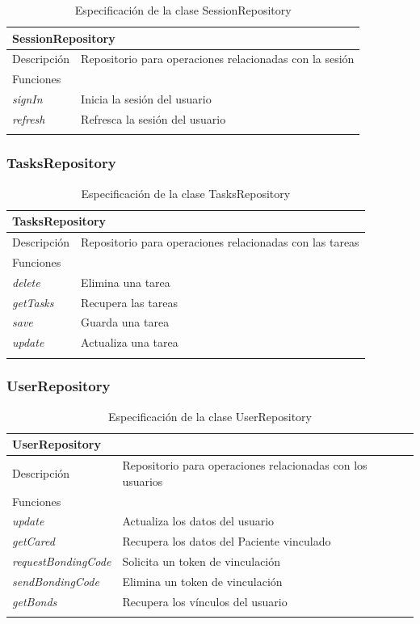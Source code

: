 \begin{longtable}{|p{} p{}|}
    \hline
    \multicolumn{2}{|l|}{SessionRepository} \\ \hline \hline
    Descripción      & Repositorio para operaciones relacionadas con la sesión \\ \hline
    \multicolumn{2}{|l|}{Funciones} \\
    \emph{signIn}  & Inicia la sesión del usuario \\
    \emph{refresh}  & Refresca la sesión del usuario \\ \hline
    \caption{Especificación de la clase SessionRepository}
    \label{class:app:session_repository}
\end{longtable}

\subsubsection{TasksRepository}

\begin{longtable}{|p{} p{}|}
    \hline
    \multicolumn{2}{|l|}{TasksRepository} \\ \hline \hline
    Descripción      & Repositorio para operaciones relacionadas con las tareas \\ \hline
    \multicolumn{2}{|l|}{Funciones} \\
    \emph{delete}  & Elimina una tarea \\
    \emph{getTasks}  & Recupera las tareas \\
    \emph{save}  & Guarda una tarea \\
    \emph{update}  & Actualiza una tarea \\ \hline
    \caption{Especificación de la clase TasksRepository}
    \label{class:app:tasks_repository}
\end{longtable}

\newpage
\subsubsection{UserRepository}

\begin{longtable}{|p{} p{}|}
    \hline
    \multicolumn{2}{|l|}{UserRepository} \\ \hline \hline
    Descripción      & Repositorio para operaciones relacionadas con los usuarios \\ \hline
    \multicolumn{2}{|l|}{Funciones} \\
    \emph{update}  & Actualiza los datos del usuario \\
    \emph{getCared}  & Recupera los datos del Paciente vinculado \\
    \emph{requestBondingCode}  & Solicita un token de vinculación \\
    \emph{sendBondingCode}  & Elimina un token de vinculación \\
    \emph{getBonds}  & Recupera los vínculos del usuario \\ \hline
    \caption{Especificación de la clase UserRepository}
    \label{class:app:user_repository}
\end{longtable}


